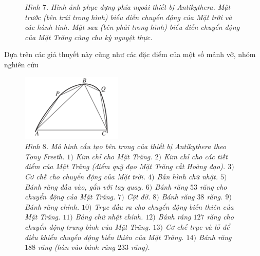 \begin{multicols}{2}
\begin{figure}[H]
		\caption{\small\textit{\color{lichsutoanhoc}Hình $7$. Hình ảnh phục dựng phía ngoài thiết bị Antikythera. Mặt trước (bên trái trong hình) biểu diễn chuyển động của Mặt trời và các hành tinh. Mặt sau (bên phải trong hình) biểu diễn chuyển động của Mặt Trăng cùng chu kỳ nguyệt thực.}}
		\vspace*{-10pt}
	\end{figure}
	Dựa trên các giả thuyết này cũng như các đặc điểm của một số mảnh vỡ, nhóm nghiên cứu 
	\end{multicols}
	\begin{figure}[H]
		\vspace*{5pt}
		\centering
		\captionsetup{labelformat= empty, justification=centering}
		\includegraphics[width= 1\linewidth]{9}
		\caption{\small\textit{\color{lichsutoanhoc}Hình $8$. Mô hình cấu tạo bên trong của thiết bị Antikythera theo Tony Freeth. $1)$ Kim chỉ cho Mặt Trăng. $2)$ Kim chỉ cho các tiết điểm của Mặt Trăng (điểm quỹ đạo Mặt Trăng cắt Hoàng đạo). $3)$ Cơ chế cho chuyển động của Mặt trời. $4)$ Bản hình chữ nhật. $5)$ Bánh răng đầu vào, gắn với tay quay. $6)$ Bánh răng $53$ răng cho chuyển động của Mặt Trăng. $7)$ Cột đỡ. $8)$ Bánh răng $38$ răng. $9)$ Bánh răng chính. $10)$ Trục đầu ra cho chuyển động biến thiên của Mặt Trăng. $11)$ Bảng chữ nhật chính. $12)$ Bánh răng $127$ răng cho chuyển động trung bình của Mặt Trăng. $13)$ Cơ chế trục và lỗ để điều khiển chuyển động biến thiên của Mặt Trăng. $14)$ Bánh răng $188$ răng (hàn vào bánh răng $233$ răng).}}
		\vspace*{-10pt}
	\end{figure}
